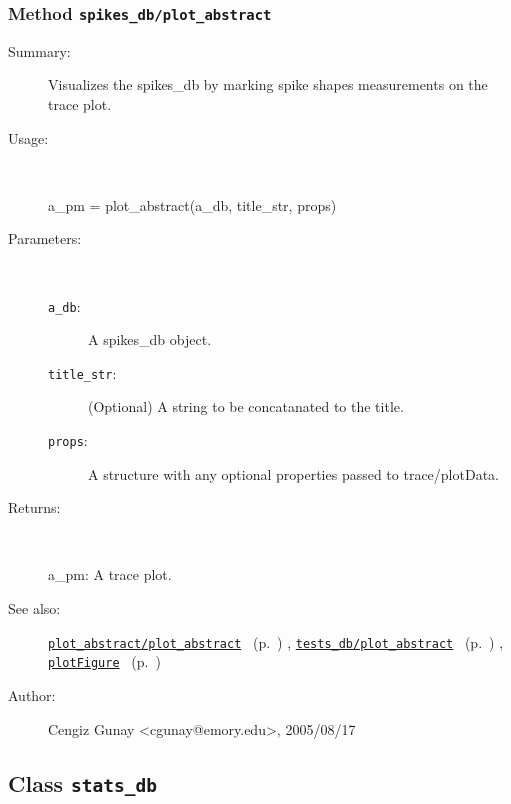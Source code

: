 \subsubsection[Method \texttt{plot\_abstract}]{Method \texttt{spikes\_db/plot\_abstract}}%
%
\label{ref_spikes_db__plot_abstract}%
\hypertarget{ref_spikes_db__plot_abstract}{}%
\begin{description}
\item[Summary:]Visualizes the spikes\_db by marking spike shapes measurements on the trace plot.
%
\item[Usage:]~%
\begin{lyxcode}%
a\_pm = plot\_abstract(a\_db, title\_str, props)
%
\end{lyxcode}%
%
%
\item[Parameters:]~
\begin{description}%
\item[\texttt{a\_db}:]
 A spikes\_db object.
\item[\texttt{title\_str}:]
 (Optional) A string to be concatanated to the title.
\item[\texttt{props}:]
 A structure with any optional properties passed to trace/plotData.
\end{description}%
%
\item[Returns:]~

	a\_pm: A trace plot.
%
%
\item[See also:]%
\hyperlink{ref_plot_abstract__plot_abstract}{\texttt{plot\_abstract/plot\_abstract}}%
\ (p.~\pageref{ref_plot_abstract__plot_abstract})%
%
, \hyperlink{ref_tests_db__plot_abstract}{\texttt{tests\_db/plot\_abstract}}%
\ (p.~\pageref{ref_tests_db__plot_abstract})%
%
, \hyperlink{ref_plotFigure}{\texttt{plotFigure}}%
\ (p.~\pageref{ref_plotFigure})%
%
%
\item[Author:]%
Cengiz Gunay <cgunay@emory.edu>, 2005/08/17%
\end{description}
\methodline%
\subsection{Class \texttt{stats\_db}}%
%
\label{ref_stats_db}%
\hypertarget{ref_stats_db}{}%
